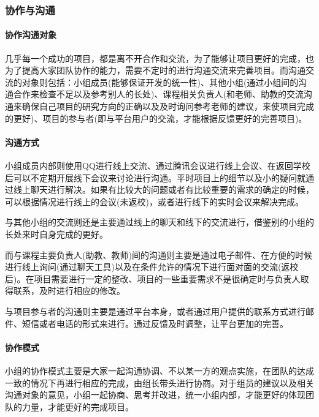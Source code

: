 \documentclass[
]{article}
\begin{document}
\hypertarget{header-n309}{%
\subsubsection{协作与沟通}\label{header-n309}}

\hypertarget{header-n310}{%
\paragraph{协作沟通对象}\label{header-n310}}

几乎每一个成功的项目，都是离不开合作和交流，为了能够让项目更好的完成，也为了提高大家团队协作的能力，需要不定时的进行沟通交流来完善项目。而沟通交流的对象则包括：小组成员(能够保证开发的统一性)、其他小组(通过小组间的沟通合作来检查不足以及参考别人的长处)、课程相关负责人(和老师、助教的交流沟通来确保自己项目的研究方向的正确以及及时询问参考老师的建议，来使项目完成的更好)、项目的参与者(即与平台用户的交流，才能根据反馈更好的完善项目)。

\hypertarget{header-n312}{%
\paragraph{沟通方式}\label{header-n312}}

小组成员内部则使用QQ进行线上交流、通过腾讯会议进行线上会议、在返回学校后可以不定期开展线下会议来讨论进行沟通。平时项目上的细节以及小的疑问就通过线上聊天进行解决。如果有比较大的问题或者有比较重要的需求的确定的时候，可以根据情况进行线上的会议(未返校)，或者进行线下的实时会议来解决完成。

与其他小组的交流则还是主要通过线上的聊天和线下的交流进行，借鉴别的小组的长处来时自身完成的更好。

而与课程主要负责人(助教、教师)间的沟通则主要是通过电子邮件、在方便的时候进行线上询问(通过聊天工具)以及在条件允许的情况下进行面对面的交流(返校后)。在项目需要进行一定的整改、项目的一些重要需求不是很确定时与负责人取得联系，及时进行相应的修改。

与项目参与者的沟通则主要是通过平台本身，或者通过用户提供的联系方式进行邮件、短信或者电话的形式来进行。通过反馈及时调整，让平台更加的完善。

\hypertarget{header-n317}{%
\paragraph{协作模式}\label{header-n317}}

小组的协作模式主要是大家一起沟通协调、不以某一方的观点实施，在团队的达成一致的情况下再进行相应的完成，由组长带头进行协商。对于组员的建议以及相关沟通对象的意见，小组一起协商、思考并改进，统一小组内部，才能更好的体现团队的力量，才能更好的完成项目。
\end{document}
